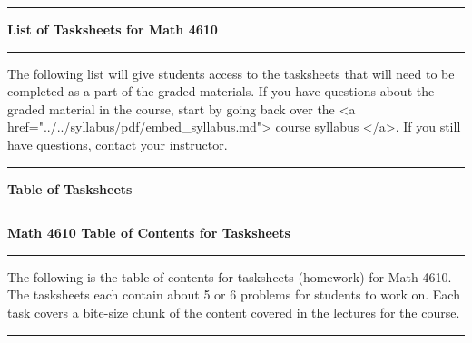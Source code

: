 \documentclass[10pt,fleqn]{article}
\begin{document}
\vskip0.1in\hrule\vskip0.1in \noindent
{\bf{\Large List of Tasksheets for Math 4610}}
\vskip0.1in\hrule\vskip0.1in \noindent
The following list will give students access to the tasksheets that will need to
be completed as a part of the graded materials. If you have questions about the
graded material in the course, start by going back over the
<a href="../../syllabus/pdf/embed\_syllabus.md"> course syllabus </a>. If you
still have questions, contact your instructor.
\vskip0.1in\hrule\vskip0.1in\noindent
{\bf Table of Tasksheets}
\vskip0.1in\hrule\vskip0.1in\noindent
\begin{center}
{\bf{\Large Math 4610 Table of Contents for Tasksheets}}
\end{center}
\vskip0.1in\hrule\vskip0.1in
\noindent
The following is the table of contents for tasksheets (homework) for Math 4610.
The tasksheets each contain about 5 or 6 problems for students to work on. Each
task covers a bite-size chunk of the content covered in the
\href{../../lectures/toc\_lectures}{lectures} for the course.
\vskip0.1in\hrule\vskip0.1in
\end{document}
